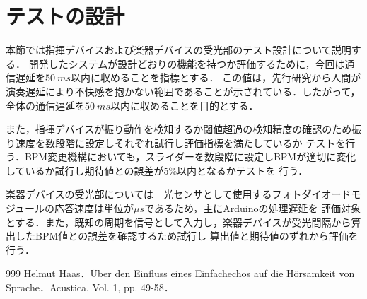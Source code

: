 \documentclass[lualatex,book,paper=a4paper,jafontsize=11.5pt,jafontscale=1.05,openany]{jlreq}
\begin{document}




\newpage
\section{テストの設計}

本節では指揮デバイスおよび楽器デバイスの受光部のテスト設計について説明する．
開発したシステムが設計どおりの機能を持つか評価するために，今回は通信遅延を$\SI{50}{ms}$以内に収めることを指標とする．
この値は，先行研究から人間が演奏遅延により不快感を抱かない範囲であることが示されている\cite{ref:tien}．したがって，
全体の通信遅延を$\SI{50}{ms}$以内に収めることを目的とする．

また，指揮デバイスが振り動作を検知するか閾値超過の検知精度の確認のため振り速度を数段階に設定しそれぞれ試行し評価指標を満たしているか
テストを行う．BPM変更機構においても，スライダーを数段階に設定しBPMが適切に変化しているか試行し期待値との誤差が5\%以内となるかテストを
行う．\par

楽器デバイスの受光部については　光センサとして使用するフォトダイオードモジュールの応答速度は単位が$\si{μs}$であるため，主にArduinoの処理遅延を
評価対象とする．また，既知の周期を信号として入力し，楽器デバイスが受光間隔から算出したBPM値との誤差を確認するため試行し
算出値と期待値のずれから評価を行う．



\begin{thebibliography}{999}
Helmut Haas．Über den Einfluss eines Einfachechos auf die Hörsamkeit von Sprache．Acustica, Vol. 1, pp. 49-58．

\end{thebibliography}
\end{document}
